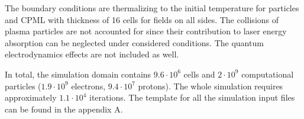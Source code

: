The boundary conditions are thermalizing to the initial temperature for particles and CPML with thickness of 16 cells for fields on all sides. The collisions of plasma particles are not accounted for since their contribution to laser energy absorption can be neglected under considered conditions. The quantum electrodynamics effects are not included as well.

In total, the simulation domain contains $ 9.6 \cdot 10^{6} $ cells and $ 2 \cdot 10^{9} $ computational particles ($ 1.9 \cdot 10^{9} $ electrons, $ 9.4 \cdot 10^{7} $ protons). The whole simulation requires approximately $ 1.1 \cdot 10^{4} $ iterations. The template for all the simulation input files can be found in the appendix A.